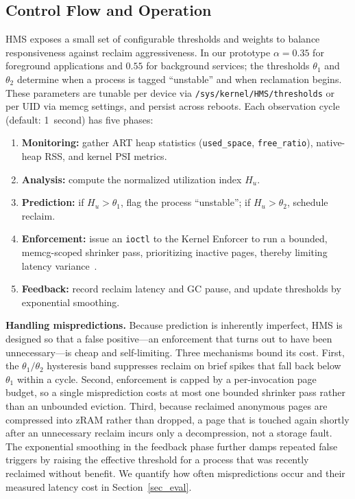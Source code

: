 \subsection{Control Flow and Operation}
\label{subsec_control_flow}
HMS exposes a small set of configurable thresholds and weights to balance responsiveness against reclaim aggressiveness. In our prototype $\alpha=0.35$ for foreground applications and $0.55$ for background services; the thresholds $\theta_1$ and $\theta_2$ determine when a process is tagged ``unstable'' and when reclamation begins. These parameters are tunable per device via \texttt{/sys/kernel/HMS/thresholds} or per UID via memcg settings, and persist across reboots. Each observation cycle (default: 1~second) has five phases:
\begin{enumerate}
  \item \textbf{Monitoring:} gather ART heap statistics (\texttt{used\_space}, \texttt{free\_ratio}), native-heap RSS, and kernel PSI metrics.
  \item \textbf{Analysis:} compute the normalized utilization index $H_u$.
  \item \textbf{Prediction:} if $H_u>\theta_1$, flag the process ``unstable''; if $H_u>\theta_2$, schedule reclaim.
  \item \textbf{Enforcement:} issue an \texttt{ioctl} to the Kernel Enforcer to run a bounded, memcg-scoped shrinker pass, prioritizing inactive pages, thereby limiting latency variance~\cite{TCE_Lim2013_VMP}.
  \item \textbf{Feedback:} record reclaim latency and GC pause, and update thresholds by exponential smoothing.
\end{enumerate}

\noindent\textbf{Handling mispredictions.}
Because prediction is inherently imperfect, HMS is designed so that a false positive---an enforcement that turns out to have been unnecessary---is cheap and self-limiting. Three mechanisms bound its cost. First, the $\theta_1/\theta_2$ hysteresis band suppresses reclaim on brief spikes that fall back below $\theta_1$ within a cycle. Second, enforcement is capped by a per-invocation page budget, so a single misprediction costs at most one bounded shrinker pass rather than an unbounded eviction. Third, because reclaimed anonymous pages are compressed into zRAM rather than dropped, a page that is touched again shortly after an unnecessary reclaim incurs only a decompression, not a storage fault. The exponential smoothing in the feedback phase further damps repeated false triggers by raising the effective threshold for a process that was recently reclaimed without benefit. We quantify how often mispredictions occur and their measured latency cost in Section~\ref{sec_eval}.

